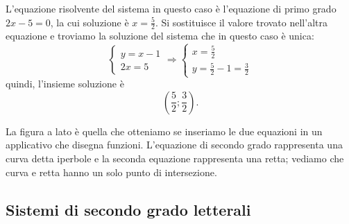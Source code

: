 \begin{exrig}
\begin{esempio}
L'equazione risolvente del sistema in questo caso è l'equazione di primo grado $2x-5=0$, la cui soluzione è $x=\frac 5 2$. Si sostituisce il valore trovato nell'altra equazione e troviamo la soluzione del sistema che in questo caso è unica: 
\[\left\{\begin{array}{l}y=x-1 \\2x=5\end{array}\right. 
\Rightarrow\left\{\begin{array}{l}x=\frac 5 2 \\
y=\frac 5 2-1=\frac 3 2\end{array}\right.\] 
quindi, l'insieme soluzione è \[\left(\frac 5 2;\frac 3 2\right).\]

\begin{multicols}{2}
La figura a lato è quella che otteniamo se inseriamo le due equazioni in un applicativo che disegna funzioni. L'equazione di secondo grado rappresenta una curva detta iperbole e la seconda equazione rappresenta una retta; vediamo che curva e retta hanno un solo punto di intersezione.
\begin{center}

\end{center}
\end{multicols}
\end{esempio}
\end{exrig}

\subsection{Sistemi di secondo grado letterali}

